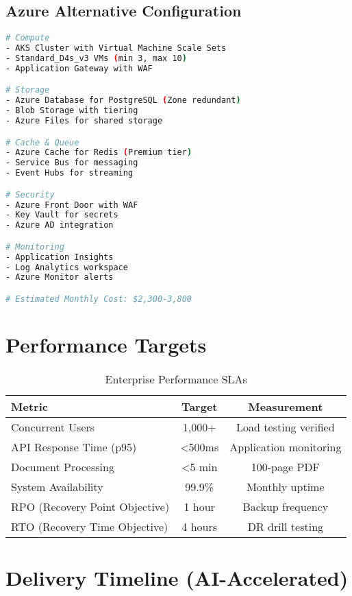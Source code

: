 \documentclass[12pt,a4paper]{report}
\begin{document}
\subsection{Azure Alternative Configuration}

\begin{lstlisting}[language=bash, caption=Azure Enterprise Infrastructure]
# Compute
- AKS Cluster with Virtual Machine Scale Sets
- Standard_D4s_v3 VMs (min 3, max 10)
- Application Gateway with WAF

# Storage
- Azure Database for PostgreSQL (Zone redundant)
- Blob Storage with tiering
- Azure Files for shared storage

# Cache & Queue
- Azure Cache for Redis (Premium tier)
- Service Bus for messaging
- Event Hubs for streaming

# Security
- Azure Front Door with WAF
- Key Vault for secrets
- Azure AD integration

# Monitoring
- Application Insights
- Log Analytics workspace
- Azure Monitor alerts

# Estimated Monthly Cost: $2,300-3,800
\end{lstlisting}

\section{Performance Targets}

\begin{table}[H]
\centering
\begin{tabularx}{\textwidth}{|X|c|c|}
\hline
\textbf{Metric} & \textbf{Target} & \textbf{Measurement} \\
\hline
Concurrent Users & 1,000+ & Load testing verified \\
API Response Time (p95) & <500ms & Application monitoring \\
Document Processing & <5 min & 100-page PDF \\
System Availability & 99.9\% & Monthly uptime \\
RPO (Recovery Point Objective) & 1 hour & Backup frequency \\
RTO (Recovery Time Objective) & 4 hours & DR drill testing \\
\hline
\end{tabularx}
\caption{Enterprise Performance SLAs}
\end{table}

\section{Delivery Timeline (AI-Accelerated)}
\end{document}
